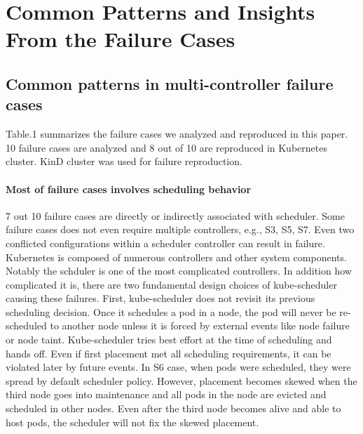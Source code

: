 \section{Common Patterns and Insights From the Failure Cases}
\label{sec:common_pattern}

\subsection*{Common patterns in multi-controller failure cases}
Table.1 summarizes the failure cases we analyzed and reproduced in this paper. 10 failure cases are analyzed and 8 out of 10 are reproduced in Kubernetes cluster. KinD cluster was used for failure reproduction.

\paragraph*{Most of failure cases involves scheduling behavior} 7 out 10 failure cases are directly or indirectly associated with scheduler. Some failure cases does not even require multiple controllers, e.g., S3, S5, S7. Even two conflicted configurations within a scheduler controller can result in failure. Kubernetes is composed of numerous controllers and other system components. Notably the schduler is one of the most complicated controllers. In addition how complicated it is, there are two fundamental design choices of kube-scheduler causing these failures. First, kube-scheduler does not revisit its previous scheduling decision. Once it schedules a pod in a node, the pod will never be re-scheduled to another node unless it is forced by external events like node failure or node taint. Kube-scheduler tries best effort at the time of scheduling and hands off. Even if first placement met all scheduling requirements, it can be violated later by future events. In S6 case, when pods were scheduled, they were spread by default scheduler policy. However, placement becomes skewed when the third node goes into maintenance and all pods in the node are evicted and scheduled in other nodes. Even after the third node becomes alive and able to host pods, the scheduler will not fix the skewed placement. 

